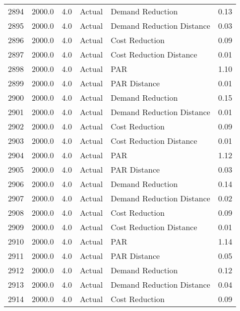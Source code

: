 \begin{longtable}{lrrllr}
2894 &       2000.0 &     4.0 &         Actual &           Demand Reduction &   0.13 \\
2895 &       2000.0 &     4.0 &         Actual &  Demand Reduction Distance &   0.03 \\
2896 &       2000.0 &     4.0 &         Actual &             Cost Reduction &   0.09 \\
2897 &       2000.0 &     4.0 &         Actual &    Cost Reduction Distance &   0.01 \\
2898 &       2000.0 &     4.0 &         Actual &                        PAR &   1.10 \\
2899 &       2000.0 &     4.0 &         Actual &               PAR Distance &   0.01 \\
2900 &       2000.0 &     4.0 &         Actual &           Demand Reduction &   0.15 \\
2901 &       2000.0 &     4.0 &         Actual &  Demand Reduction Distance &   0.01 \\
2902 &       2000.0 &     4.0 &         Actual &             Cost Reduction &   0.09 \\
2903 &       2000.0 &     4.0 &         Actual &    Cost Reduction Distance &   0.01 \\
2904 &       2000.0 &     4.0 &         Actual &                        PAR &   1.12 \\
2905 &       2000.0 &     4.0 &         Actual &               PAR Distance &   0.03 \\
2906 &       2000.0 &     4.0 &         Actual &           Demand Reduction &   0.14 \\
2907 &       2000.0 &     4.0 &         Actual &  Demand Reduction Distance &   0.02 \\
2908 &       2000.0 &     4.0 &         Actual &             Cost Reduction &   0.09 \\
2909 &       2000.0 &     4.0 &         Actual &    Cost Reduction Distance &   0.01 \\
2910 &       2000.0 &     4.0 &         Actual &                        PAR &   1.14 \\
2911 &       2000.0 &     4.0 &         Actual &               PAR Distance &   0.05 \\
2912 &       2000.0 &     4.0 &         Actual &           Demand Reduction &   0.12 \\
2913 &       2000.0 &     4.0 &         Actual &  Demand Reduction Distance &   0.04 \\
2914 &       2000.0 &     4.0 &         Actual &             Cost Reduction &   0.09 \\

\end{longtable}
